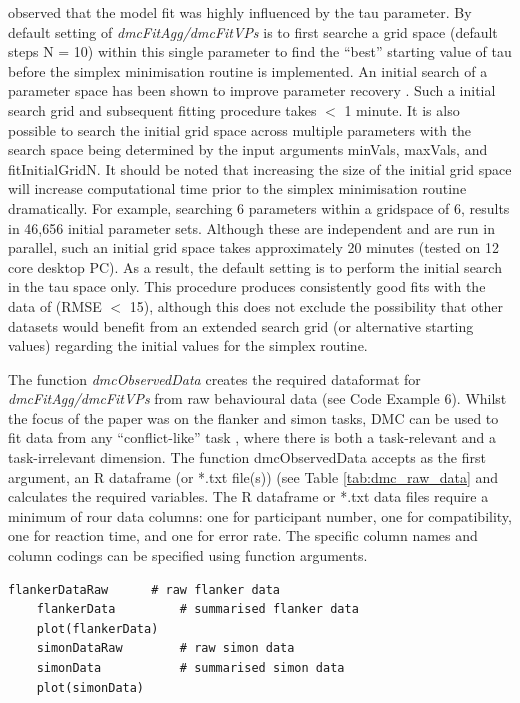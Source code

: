 \textcite{ulrich2015automatic} observed that the model fit was highly
influenced by the tau parameter. By default setting of
\textit{dmcFitAgg/dmcFitVPs} is to first searche a grid space (default steps N
= 10) within this single parameter to find the ``best'' starting value of tau
before the simplex minimisation routine is implemented. An initial search of a
parameter space has been shown to improve parameter recovery
\parencite{hubnerimproving}. Such a initial search grid and subsequent fitting
procedure takes $<$ 1 minute. It is also possible to search the initial grid
space across multiple parameters with the search space being determined by the
input arguments minVals, maxVals, and fitInitialGridN. It should be noted that
increasing the size of the initial grid space will increase computational time
prior to the simplex minimisation routine dramatically. For example, searching
6 parameters within a gridspace of 6, results in 46,656 initial parameter sets.
Although these are independent and are run in parallel, such an initial grid
space takes approximately 20 minutes (tested on 12 core desktop PC). As a
result, the default setting is to perform the initial search in the tau space
only. This procedure produces consistently good fits with the data of
\textcite{ulrich2015automatic} (RMSE $<$ 15), although this does not exclude
the possibility that other datasets would benefit from an extended search grid
(or alternative starting values) regarding the initial values for the simplex
routine.

The function \textit{dmcObservedData} creates the required dataformat for
\textit{dmcFitAgg/dmcFitVPs} from raw behavioural data (see Code Example 6).
Whilst the focus of the \textcite{ulrich2015automatic} paper was on the flanker
and simon tasks, DMC can be used to fit data from any ``conflict-like'' task ,
where there is both a task-relevant and a task-irrelevant dimension. The
function dmcObservedData accepts as the first argument, an R dataframe (or
*.txt file(s)) (see Table \ref{tab:dmc_raw_data} and calculates the required
variables. The R dataframe or *.txt data files require a minimum of rour data
columns: one for participant number, one for compatibility, one for reaction
time, and one for error rate. The specific column names and column codings can
be specified using function arguments.

\begin{minipage}{\linewidth}
    \begin{lstlisting}[style = R, title = {
        R Code Example 4: The package contains the data from
        \textcite{ulrich2015automatic}. A figure of the summarized data can be
        produced by calling \textit{plot} with the observed data as an input
        argument.
        }, captionpos = t]
    flankerDataRaw      # raw flanker data
    flankerData         # summarised flanker data
    plot(flankerData)
    simonDataRaw        # raw simon data
    simonData           # summarised simon data
    plot(simonData)
        \end{lstlisting}
    \end{minipage}

